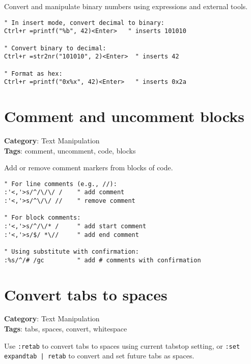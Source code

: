 {{{{{{{{{{{{{{Convert and manipulate binary numbers using expressions and external tools.

\begin{Exa*}{}
\begin{Verbatim}[fontsize=\footnotesize, breaklines, breakanywhere]
" In insert mode, convert decimal to binary:
Ctrl+r =printf("%b", 42)<Enter>   " inserts 101010

" Convert binary to decimal:
Ctrl+r =str2nr("101010", 2)<Enter>  " inserts 42

" Format as hex:
Ctrl+r =printf("0x%x", 42)<Enter>   " inserts 0x2a
\end{Verbatim}
\end{Exa*}

\section{Comment and uncomment blocks}

\textbf{Category}: Text Manipulation\\ \textbf{Tags}: comment, uncomment, code, blocks
\vspace{0.5cm}

Add or remove comment markers from blocks of code.

\begin{Exa*}{}
\begin{Verbatim}[fontsize=\footnotesize, breaklines, breakanywhere]
" For line comments (e.g., //):
:'<,'>s/^/\/\/ /    " add comment
:'<,'>s/^\/\/ //    " remove comment

" For block comments:
:'<,'>s/^/\/* /     " add start comment
:'<,'>s/$/ *\//     " add end comment

" Using substitute with confirmation:
:%s/^/# /gc         " add # comments with confirmation
\end{Verbatim}
\end{Exa*}

\section{Convert tabs to spaces}

\textbf{Category}: Text Manipulation\\ \textbf{Tags}: tabs, spaces, convert, whitespace
\vspace{0.5cm}

Use {\footnotesize \Verb§:retab§} to convert tabs to spaces using current tabstop setting, or {\footnotesize \Verb§:set expandtab | retab§} to convert and set future tabs as spaces.

}}}}}}}}}}}}}}
